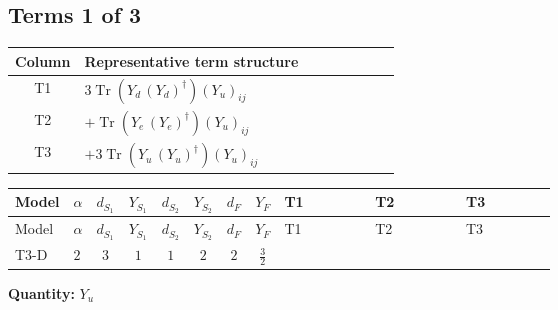 \documentclass[8pt]{article}
\begin{document}
\begin{landscape}
\subsection*{Terms 1 of 3}
\begin{center}
\begin{tabular}{@{}c >{\raggedright\arraybackslash}p{0.82\linewidth}@{}}
\toprule
Column & Representative term structure \\
\midrule
T1 & \(\displaystyle 3 \operatorname{Tr}\!\left({Y_d}\,\left({Y_d}\right)^{\dagger}\right) \left({Y_u}\right)_{ij}\) \\
\midrule
T2 & \(\displaystyle +\operatorname{Tr}\!\left({Y_e}\,\left({Y_e}\right)^{\dagger}\right) \left({Y_u}\right)_{ij}\) \\
\midrule
T3 & \(\displaystyle +3 \operatorname{Tr}\!\left({Y_u}\,\left({Y_u}\right)^{\dagger}\right) \left({Y_u}\right)_{ij}\) \\
\midrule
\bottomrule
\end{tabular}
\end{center}
\smallskip
\tiny
\begin{longtable}{@{}llcccccc >{\raggedright\arraybackslash}p{0.21\linewidth} >{\raggedright\arraybackslash}p{0.21\linewidth} >{\raggedright\arraybackslash}p{0.21\linewidth}@{}}
\toprule
Model & $\alpha$ & $d_{S_1}$ & $Y_{S_1}$ & $d_{S_2}$ & $Y_{S_2}$ & $d_F$ & $Y_F$ & T1 & T2 & T3 \\
\midrule
\endfirsthead
\toprule
Model & $\alpha$ & $d_{S_1}$ & $Y_{S_1}$ & $d_{S_2}$ & $Y_{S_2}$ & $d_F$ & $Y_F$ & T1 & T2 & T3 \\
\midrule
\endhead
T3-D & $2$ & $3$ & $1$ & $1$ & $2$ & $2$ & $\frac{3}{2}$ & \scriptsize\adjustbox{max width=\linewidth}{$\begin{gathered} 3 \operatorname{Tr}\!\left({Y_d}\,\left({Y_d}\right)^{\dagger}\right) \left({Y_u}\right)_{ij}\end{gathered}$} & \scriptsize\adjustbox{max width=\linewidth}{$\begin{gathered} +\operatorname{Tr}\!\left({Y_e}\,\left({Y_e}\right)^{\dagger}\right) \left({Y_u}\right)_{ij}\end{gathered}$} & \scriptsize\adjustbox{max width=\linewidth}{$\begin{gathered} +3 \operatorname{Tr}\!\left({Y_u}\,\left({Y_u}\right)^{\dagger}\right) \left({Y_u}\right)_{ij}\end{gathered}$} \\
\midrule
\bottomrule
\end{longtable}
\clearpage
\noindent\textbf{Quantity: }$Y_u$\par\smallskip

\end{landscape}
\end{document}
